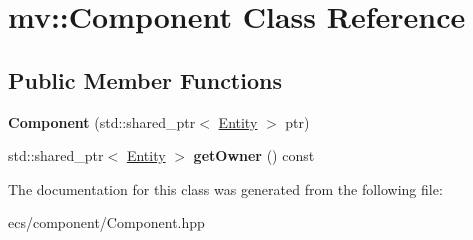 \hypertarget{classmv_1_1_component}{}\section{mv\+:\+:Component Class Reference}
\label{classmv_1_1_component}
\subsection*{Public Member Functions}
\begin{DoxyCompactItemize}
\item 
\mbox{\label{classmv_1_1_component_a605a74ffe7181bfe7f867be3355ceeb1}} 
{\bfseries Component} (std\+::shared\+\_\+ptr$<$ \mbox{\hyperlink{classmv_1_1_entity}{Entity}} $>$ ptr)
\item 
\mbox{\label{classmv_1_1_component_a052375418956ec0810e9cdf4bbc18c69}} 
std\+::shared\+\_\+ptr$<$ \mbox{\hyperlink{classmv_1_1_entity}{Entity}} $>$ {\bfseries get\+Owner} () const
\end{DoxyCompactItemize}


The documentation for this class was generated from the following file\+:\begin{DoxyCompactItemize}
\item 
ecs/component/Component.\+hpp\end{DoxyCompactItemize}

